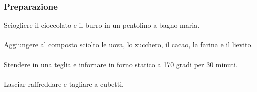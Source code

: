 \documentclass[12pt, a4paper]{article}
\begin{document}
\subsubsection{Preparazione}
	Sciogliere il cioccolato e il burro in un pentolino a bagno maria.\\\\
	Aggiungere al composto sciolto le uova, lo zucchero, il cacao, la farina e il lievito.\\\\
	Stendere in una teglia e infornare in forno statico a 170 gradi per 30 minuti.\\\\
	Lasciar raffreddare e tagliare a cubetti.
\clearpage
\end{document}
